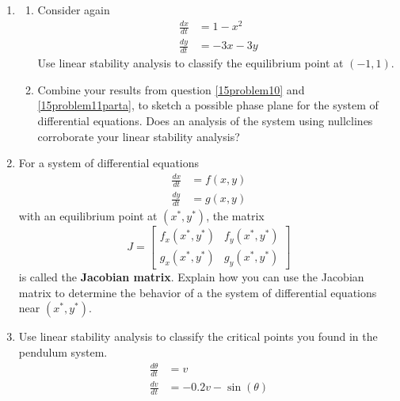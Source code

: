 \begin{enumerate}[resume]
\clearpage

\item \label{15problem11}
\begin{enumerate}
\item Consider again
\begin{align*}
\frac{dx}{dt} &= 1-x^2 \\
\frac{dy}{dt} &= -3x -3y
\end{align*}
Use linear stability analysis to classify the equilibrium point at $(-1,1)$. \label{15problem11parta} \vfill
\item Combine your results from question \ref{15problem10} and \ref{15problem11parta}, to sketch a possible phase plane for the system of differential equations. Does an analysis of the system using nullclines corroborate your linear stability analysis? \label{15problem11partb} \vfill
\end{enumerate}

\clearpage

\item For a system of differential equations
\begin{align*}
\frac{dx}{dt} &= f(x,y) \\
\frac{dy}{dt} &= g(x,y)
\end{align*}
with an equilibrium point at $(x^*,y^*)$, the matrix
\[
J =
\begin{bmatrix}
f_x(x^*,y^*) & f_y(x^*,y^*) \\
g_x(x^*,y^*) & g_y(x^*,y^*)
\end{bmatrix}
\]
is called the \textbf{Jacobian matrix}. Explain how you can use the Jacobian matrix to determine the behavior of a the system of differential equations near $(x^*,y^*)$. \label{15problem12} \vfill

\item Use linear stability analysis to classify the critical points you found in the pendulum system. \label{15problem13}
\begin{align*}
\frac{d\theta}{dt} &=v \\
\frac{dv}{dt} &= -0.2v - \sin(\theta)
\end{align*}
\vfill

\end{enumerate}

\clearpage


